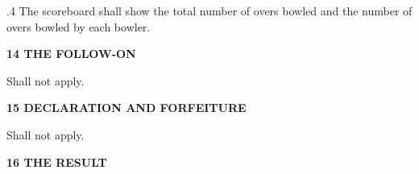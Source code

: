 \documentclass[12pt]{article}
\begin{document}
\vspace{\baselineskip}
\begin{adjustwidth}{0.5in}{0.38in}
{\fontsize{9pt}{10.8pt}.4 \tabto{0.49in} The scoreboard shall show the total number of overs bowled and the number of overs bowled by each bowler.\par}\par

\end{adjustwidth}


\vspace{\baselineskip}
{\fontsize{16pt}{19.2pt}\selectfont \textbf{14 THE FOLLOW-ON}\par}\par


\vspace{\baselineskip}
{\fontsize{9pt}{10.8pt}\selectfont Shall not apply.\par}\par


\vspace{\baselineskip}

\vspace{\baselineskip}

\vspace{\baselineskip}

\vspace{\baselineskip}

\vspace{\baselineskip}

\vspace{\baselineskip}

\vspace{\baselineskip}
\begin{Center}
{\fontsize{8pt}{9.6pt}\par}
\end{Center}\par


\vspace{\baselineskip}
{\fontsize{16pt}{19.2pt}\selectfont \textbf{15 DECLARATION AND FORFEITURE}\par}\par


\vspace{\baselineskip}
{\fontsize{9pt}{10.8pt}\selectfont Shall not apply.\par}\par


\vspace{\baselineskip}
{\fontsize{16pt}{19.2pt}\selectfont \textbf{16 THE RESULT}\par}\par
\end{document}
